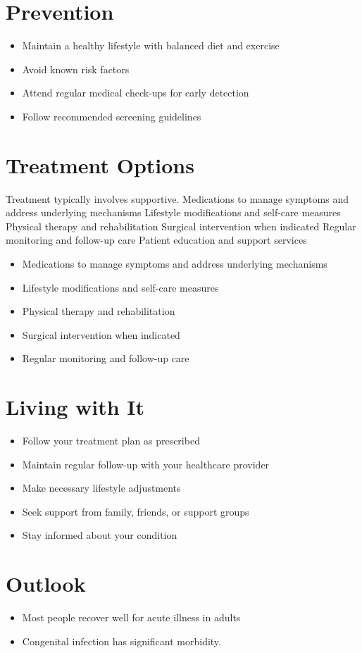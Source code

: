 \section{Prevention}
\begin{itemize}[noitemsep]
  \item Maintain a healthy lifestyle with balanced diet and exercise
  \item Avoid known risk factors
  \item Attend regular medical check-ups for early detection
  \item Follow recommended screening guidelines
\end{itemize}
\section{Treatment Options}
Treatment typically involves supportive. Medications to manage symptoms and address underlying mechanisms Lifestyle modifications and self-care measures Physical therapy and rehabilitation Surgical intervention when indicated Regular monitoring and follow-up care Patient education and support services

\begin{itemize}[noitemsep]
  \item Medications to manage symptoms and address underlying mechanisms
  \item Lifestyle modifications and self-care measures
  \item Physical therapy and rehabilitation
  \item Surgical intervention when indicated
  \item Regular monitoring and follow-up care
\end{itemize}
\section{Living with It}
\begin{itemize}[noitemsep]
  \item Follow your treatment plan as prescribed
  \item Maintain regular follow-up with your healthcare provider
  \item Make necessary lifestyle adjustments
  \item Seek support from family, friends, or support groups
  \item Stay informed about your condition
\end{itemize}
\section{Outlook}
\begin{itemize}[noitemsep]
  \item Most people recover well for acute illness in adults
  \item Congenital infection has significant morbidity.
\end{itemize}
